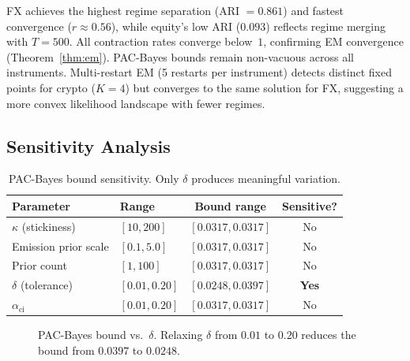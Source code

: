 \documentclass[11pt]{article}
\begin{document}
FX achieves the highest regime separation (ARI $= 0.861$) and fastest
convergence ($r \approx 0.56$), while equity's low ARI ($0.093$)
reflects regime merging with $T{=}500$.  All contraction rates
converge below~$1$, confirming EM convergence
(Theorem~\ref{thm:em}).  PAC-Bayes bounds remain non-vacuous across
all instruments.  Multi-restart EM (5 restarts per instrument) detects
distinct fixed points for crypto ($K{=}4$) but converges to the same
solution for FX, suggesting a more convex likelihood landscape with
fewer regimes.

\subsection{Sensitivity Analysis}

\begin{table}[t]
\centering
\caption{PAC-Bayes bound sensitivity.  Only $\delta$ produces
meaningful variation.}\label{tab:sensitivity}
\small
\begin{tabular}{@{}llcc@{}}
\toprule
\textbf{Parameter} & \textbf{Range} & \textbf{Bound range}
  & \textbf{Sensitive?} \\
\midrule
$\kappa$ (stickiness)  & $[10, 200]$
  & $[0.0317, 0.0317]$ & No \\
Emission prior scale   & $[0.1, 5.0]$
  & $[0.0317, 0.0317]$ & No \\
Prior count            & $[1, 100]$
  & $[0.0317, 0.0317]$ & No \\
$\delta$ (tolerance)   & $[0.01, 0.20]$
  & $[0.0248, 0.0397]$ & \textbf{Yes} \\
$\alpha_{\mathrm{ci}}$ & $[0.01, 0.20]$
  & $[0.0317, 0.0317]$ & No \\
\bottomrule
\end{tabular}
\end{table}

\begin{figure}[t]
\centering
{}
\caption{PAC-Bayes bound vs.\ $\delta$.  Relaxing $\delta$ from
$0.01$ to $0.20$ reduces the bound from $0.0397$ to
$0.0248$.}\label{fig:delta}
\end{figure}
\end{document}
